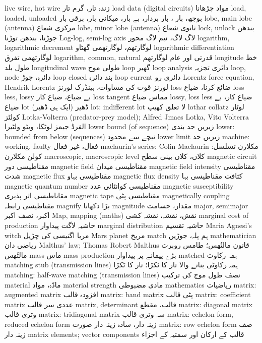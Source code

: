 live wire, hot wire	زندہ تار، گرم تار
load data (digital circuits)	مواد چڑھانا
load, loaded, unloaded	بوجھ، بار ، بار بردار، بے بار، میکانی بار، برقی بار
lobe, main lobe (antenna)	مرکزی شعاع
lobe, minor lobe (antenna)	ثانوی شعاع
lock, unlock	بندھن جوڑنا، بندھن توڑنا
Log-log, semi-log axis	لاگ لاگ، نیم لاگ محور
logarithm, logarithmic decrement	لوگارتھم، لوگارتھمی گھٹاو
logarithmic differentiation	لوگارتھمی تفرق
logarithm, common, natural	قدرتی اور عام لوگارتھم
longitude	خط طول بلد
longitudinal wave	طولی موج
loop	گھیر
loop analysis	دائری تجزیہ
loop, node	دائرہ، جوڑ
loop closed	بند دائرہ
loop current	دائری رو
Lorentz force equation, Hendrik Lorentz	لورنز قوت کی مساوات، ہینڈرک لورنز
loss	ضائع کرنا، ضیاع
loss less, lossy	بے ضیاع، ضیاع کار
loss tangent	مماس ضیاع
lossy, loss less	ضیاع کار، بے ضیاع
lot	ڈھیر (ایک ہی ڈھیر)
lot: indifferent lot	لا تعلق کھیپ
lothar collatz	لوٹار کولٹز
Lotka-Volterra (predator-prey model); Alfred Jmaes Lotka, Vito Volterra	الفرڈ جیمز لوٹکا، ویٹو ولٹیرا
lower bound (of sequence)	زیریں حد بندی
lower: bounded from below (sequences)	نیچے سے محدود
lower limit	زیریں حد
machine: working, faulty	فعال، غیر فعال
maclaurin's series: Colin Maclaurin	مکلارن تسلسل: کولن مکلارن
macroscopic, macroscopic level	کلاں، کلاں بینی سطح
magnetic circuit	مقناطیسی دور
magnetic field	مقناطیسی میدان
magnetic field intensity	مقناطیسی شدت
magnetic flux	مقناطیسی بہاو
magnetic flux density	کثافت مقناطیسی بہا
magnetic quantum number	مقناطیسی کوانٹائی عدد
magnetic susceptibility	مقاناطیسی اثر پذیری
magnetic tape	مقناطیسی پٹی
magnetically coupling	مقناطیسی رابطہ
magnify	بڑا دکھانا
magnitude	مقدار، جسامت
major, semimajor 	اکبر، نصف اکبر
Map, mapping (maths)	نقش، نقشہ، نقشہ کشی
marginal cost of production	حاشیہ لاگت پیداوار
marginal distribution	حاشیہ تقسیم
Maria Agnesi’s witch	مریا اگنیسی کی چڑیل
Mars planet	مریخ
match	ہم پلہ، جوڑیں
mathematician	ریاضی دان
Malthus' law; Thomas Robert Malthus	قانون مالتُھس؛ طامس روبرٹ مالتُھس
mass	ماس
mass production	بڑے پیمانے پر پیداوار
matched	ہمہ رکاوٹ
matching stub (transmission lines)	ہمہ رکاوٹی بنانے والا تار کا ٹکڑا؛ تار کا ٹکڑا
matching: half-wave matching (transmission lines)	نصف طول موج کی ترکیب
material	مادّہ،  مواد
material strength	مادی مضبوطی
mathematics	ریاضیات
matrix: augmented matrix	افزودہ قالب
matrix: band matrix	پٹی قالب
matrix: coefficient matrix	عددی سر قالب
matrix, determinant	قالب، مقطع
matrix: diagonal matrix	وتری قالب
matrix: tridiagonal matrix	سہ وتری قالب
matrix: echelon form, reduced echelon form	زینہ دار، سادہ زینہ دار صورت
matrix: row echelon form	صف زینہ دار
matrix elements; vector components	قالب کے ارکان اور سمتیہ کے اجزاء

